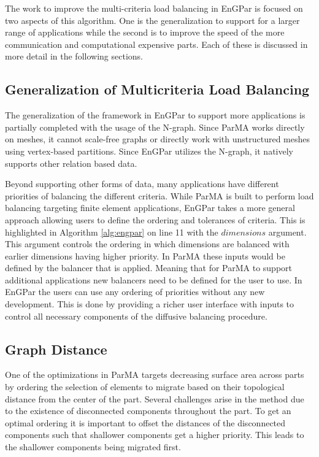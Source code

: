 The work to improve the multi-criteria load
balancing in EnGPar is focused
on two aspects of this algorithm. One is the
generalization to support for a larger range of applications
while the second is to improve the speed of the
more communication and computational expensive parts.
Each of these is discussed in more detail in the following sections.

\subsection{Generalization of Multicriteria Load Balancing}
The generalization of the framework in EnGPar to support more
applications is partially completed with the usage of the N-graph.
Since ParMA works directly on meshes, it cannot 
scale-free graphs \cite{pienta2013parallel,gonzalez2012powergraph}
or directly work with unstructured
meshes using vertex-based partitions. Since EnGPar utilizes
the N-graph, it natively
supports other relation based data.

Beyond supporting other forms of data, many applications have
different priorities of balancing the different criteria. While
ParMA is built to perform load balancing targeting finite element
applications, EnGPar takes a more general approach
allowing users to define the ordering and tolerances of criteria.
This is highlighted in Algorithm \ref{alg:engpar} on line 11 with
the $dimensions$ argument. This argument controls the ordering in
which dimensions are balanced with earlier dimensions having higher
priority. In ParMA these inputs would be defined by the balancer
that is applied. Meaning that for ParMA to support additional
applications new balancers need to be defined for the user to use.
In EnGPar the users can use any ordering of priorities
without any new development. This is done by providing
a richer user interface with inputs to control all
necessary components of the diffusive balancing procedure.

\subsection{Graph Distance}
One of the optimizations in ParMA targets decreasing surface area across parts
by ordering the selection of elements to migrate based on their topological
distance from the center of the part. Several challenges arise in the method
due to the existence of disconnected components throughout the part. To get
an optimal ordering it is important to offset the distances of the disconnected
components such that shallower components get a higher priority. This leads to
the shallower components being migrated first. 

